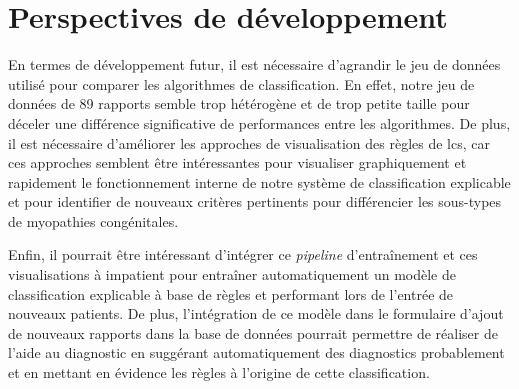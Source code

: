 \section{Perspectives de développement}
En termes de développement futur, il est nécessaire d'agrandir le jeu de données utilisé pour comparer les algorithmes de classification. En effet, notre jeu de données de 89 rapports semble trop hétérogène et de trop petite taille pour déceler une différence significative de performances entre les algorithmes. De plus, il est nécessaire d'améliorer les approches de visualisation des règles de \gls{lcs}, car ces approches semblent être intéressantes pour visualiser graphiquement et rapidement le fonctionnement interne de notre système de classification explicable et pour identifier de nouveaux critères pertinents pour différencier les sous-types de myopathies congénitales.

Enfin, il pourrait être intéressant d'intégrer ce \textit{pipeline} d'entraînement et ces visualisations à \gls{impatient} pour entraîner automatiquement un modèle de classification explicable à base de règles et  performant lors de l'entrée de nouveaux patients. De plus, l'intégration de ce modèle dans le formulaire d'ajout de nouveaux rapports dans la base de données pourrait permettre de réaliser de l'aide au diagnostic en suggérant automatiquement des diagnostics probablement et en mettant en évidence les règles à l'origine de cette classification.